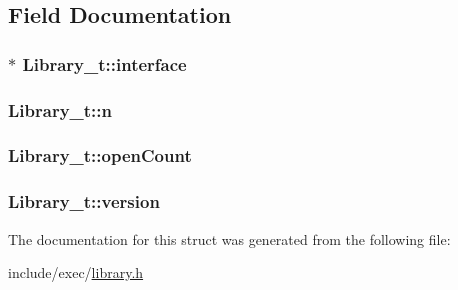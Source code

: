 \subsection{Field Documentation}
\hypertarget{structLibrary__t_ad3b1242015e72d6afa2d2e7ad5ca8c36}{
\subsubsection[{interface}]{$\ast$ Library\+\_\+t\+::interface}}\label{structLibrary__t_ad3b1242015e72d6afa2d2e7ad5ca8c36}
\hypertarget{structLibrary__t_afa620b3754d0d0563c2e4c6de5366d27}{
\subsubsection[{n}]{ Library\+\_\+t\+::n}}\label{structLibrary__t_afa620b3754d0d0563c2e4c6de5366d27}
\hypertarget{structLibrary__t_a714bcc96d390e14c5657d686f1a2a7c5}{
\subsubsection[{open\+Count}]{ Library\+\_\+t\+::open\+Count}}\label{structLibrary__t_a714bcc96d390e14c5657d686f1a2a7c5}
\hypertarget{structLibrary__t_a3ea09c5d30d2c42f0a2d6c31d486df86}{
\subsubsection[{version}]{ Library\+\_\+t\+::version}}\label{structLibrary__t_a3ea09c5d30d2c42f0a2d6c31d486df86}


The documentation for this struct was generated from the following file\+:\begin{DoxyCompactItemize}
\item 
include/exec/\hyperlink{library_8h}{library.\+h}\end{DoxyCompactItemize}
